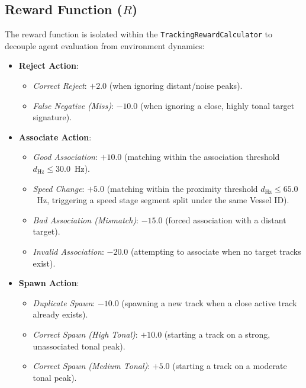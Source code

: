\documentclass[12pt,a4paper]{article}
\begin{document}
\subsection{Reward Function ($R$)}
The reward function is isolated within the \texttt{TrackingRewardCalculator} to decouple agent evaluation from environment dynamics:
\begin{itemize}
    \item \textbf{Reject Action}:
    \begin{itemize}
        \item \textit{Correct Reject}: $+2.0$ (when ignoring distant/noise peaks).
        \item \textit{False Negative (Miss)}: $-10.0$ (when ignoring a close, highly tonal target signature).
    \end{itemize}
    \item \textbf{Associate Action}:
    \begin{itemize}
        \item \textit{Good Association}: $+10.0$ (matching within the association threshold $d_{\text{Hz}} \le 30.0$~Hz).
        \item \textit{Speed Change}: $+5.0$ (matching within the proximity threshold $d_{\text{Hz}} \le 65.0$~Hz, triggering a speed stage segment split under the same Vessel ID).
        \item \textit{Bad Association (Mismatch)}: $-15.0$ (forced association with a distant target).
        \item \textit{Invalid Association}: $-20.0$ (attempting to associate when no target tracks exist).
    \end{itemize}
    \item \textbf{Spawn Action}:
    \begin{itemize}
        \item \textit{Duplicate Spawn}: $-10.0$ (spawning a new track when a close active track already exists).
        \item \textit{Correct Spawn (High Tonal)}: $+10.0$ (starting a track on a strong, unassociated tonal peak).
        \item \textit{Correct Spawn (Medium Tonal)}: $+5.0$ (starting a track on a moderate tonal peak).
    \end{itemize}
\end{itemize}
\end{document}
